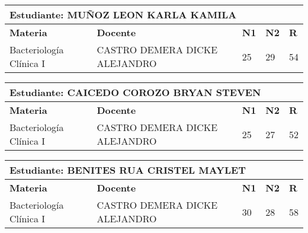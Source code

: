 \small
\begin{tabularx}{\textwidth}{|p{5cm}|p{7cm}|X|X|X|}
\hline
\multicolumn{5}{|p{\dimexpr\textwidth-2\tabcolsep-2\arrayrulewidth}|}{\textbf{Estudiante: MUÑOZ LEON KARLA KAMILA }}\\\hline
\textbf{Materia} & \textbf{Docente} & \textbf{N1} & \textbf{N2} & \textbf{R} \\ \hline
Bacteriología Clínica I & CASTRO DEMERA DICKE ALEJANDRO  & 25 & 29& 54 \\ \hline
\end{tabularx}\vspace{10mm}
\small
\begin{tabularx}{\textwidth}{|p{5cm}|p{7cm}|X|X|X|}
\hline
\multicolumn{5}{|p{\dimexpr\textwidth-2\tabcolsep-2\arrayrulewidth}|}{\textbf{Estudiante: CAICEDO COROZO BRYAN STEVEN }}\\\hline
\textbf{Materia} & \textbf{Docente} & \textbf{N1} & \textbf{N2} & \textbf{R} \\ \hline
Bacteriología Clínica I & CASTRO DEMERA DICKE ALEJANDRO  & 25 & 27& 52 \\ \hline
\end{tabularx}\vspace{10mm}
\small
\begin{tabularx}{\textwidth}{|p{5cm}|p{7cm}|X|X|X|}
\hline
\multicolumn{5}{|p{\dimexpr\textwidth-2\tabcolsep-2\arrayrulewidth}|}{\textbf{Estudiante: BENITES RUA CRISTEL MAYLET }}\\\hline
\textbf{Materia} & \textbf{Docente} & \textbf{N1} & \textbf{N2} & \textbf{R} \\ \hline
Bacteriología Clínica I & CASTRO DEMERA DICKE ALEJANDRO  & 30 & 28& 58 \\ \hline
\end{tabularx}\vspace{10mm}
